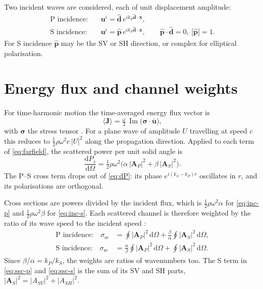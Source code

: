 \documentclass[11pt,a4paper]{article}
\newcommand{\bx}{\mathbf{x}}
\newcommand{\dd}{\mathrm{d}}
\newcommand{\bu}{\mathbf{u}}
\newcommand{\bA}{\mathbf{A}}
\newcommand{\bJ}{\mathbf{J}}
\newcommand{\bd}{\hat{\mathbf{d}}}
\newcommand{\bp}{\hat{\mathbf{p}}}
\newcommand{\bsig}{\boldsymbol{\sigma}}
\newcommand{\ssc}{\sigma_{\mathrm{sc}}}
\newcommand{\kp}{k_{P}}
\newcommand{\ks}{k_{S}}
\DeclareMathOperator{\Imag}{Im}
\begin{document}
Two incident waves are considered, each of unit displacement amplitude:
\begin{align}
  \text{P incidence:}\quad & \bu^{i} = \bd\, e^{i\kp \bd\cdot\bx},
  \label{eq:inc-p}\\
  \text{S incidence:}\quad & \bu^{i} = \bp\, e^{i\ks \bd\cdot\bx},
  \qquad \bp\cdot\bd = 0,\ |\bp| = 1 .
  \label{eq:inc-s}
\end{align}
For S incidence $\bp$ may be the SV or SH direction, or complex for
elliptical polarisation.

\section{Energy flux and channel weights}
\label{sec:flux}

For time-harmonic motion the time-averaged energy flux vector is
\begin{equation}
  \langle \bJ \rangle = \tfrac{\omega}{2}\,
    \Imag\bigl(\bsig\cdot\bar{\bu}\bigr),
  \label{eq:flux}
\end{equation}
with $\bsig$ the stress tensor \citep{Achenbach1973,AkiRichards2002}.
For a plane wave of amplitude $U$ travelling at speed $c$ this reduces
to $\tfrac12\rho\omega^2 c\,|U|^2$ along the propagation direction.
Applied to each term of \eqref{eq:farfield}, the scattered power per
unit solid angle is
\begin{equation}
  \frac{\dd P_{s}}{\dd\Omega}
  = \tfrac12\rho\omega^{2}
    \bigl(\alpha\,|\bA_P|^{2} + \beta\,|\bA_S|^{2}\bigr).
  \label{eq:dP}
\end{equation}
The P--S cross term drops out of \eqref{eq:dP}: its phase
$e^{i(\ks-\kp)r}$ oscillates in $r$, and its polarisations are
orthogonal.

Cross sections are powers divided by the incident flux, which is
$\tfrac12\rho\omega^2 \alpha$ for \eqref{eq:inc-p} and
$\tfrac12\rho\omega^2 \beta$ for \eqref{eq:inc-s}. Each scattered
channel is therefore weighted by the ratio of its wave speed to the
incident speed \citep{WuAki1985,SatoFehlerMaeda2012}:
\begin{align}
  \text{P incidence:}\quad
  \ssc &= \oint |\bA_P|^{2}\,\dd\Omega
        + \frac{\beta}{\alpha}\oint |\bA_S|^{2}\,\dd\Omega ,
  \label{eq:ssc-p}\\
  \text{S incidence:}\quad
  \ssc &= \frac{\alpha}{\beta}\oint |\bA_P|^{2}\,\dd\Omega
        + \oint |\bA_S|^{2}\,\dd\Omega .
  \label{eq:ssc-s}
\end{align}
Since $\beta/\alpha = \kp/\ks$, the weights are ratios of wavenumbers
too. The S term in \eqref{eq:ssc-p} and \eqref{eq:ssc-s} is the sum of
its SV and SH parts, $|\bA_S|^2 = |A_{SV}|^2 + |A_{SH}|^2$.
\end{document}
